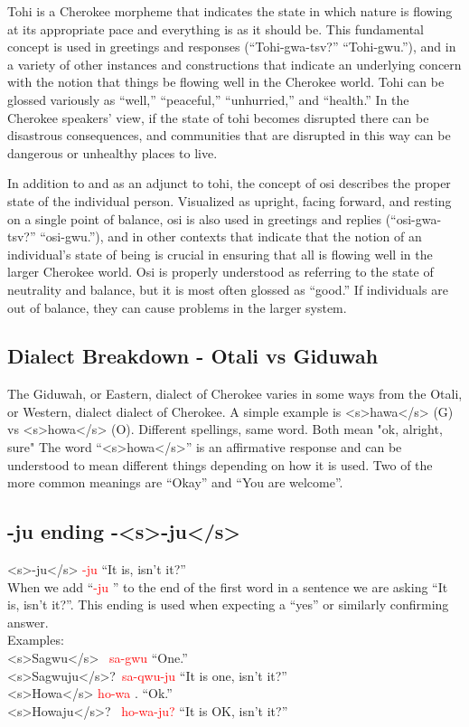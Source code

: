 Tohi is a Cherokee morpheme that indicates the state in which nature is flowing at its appropriate
pace and everything is as it should be. This fundamental concept
is used in greetings and responses (“Tohi-gwa-tsv?” “Tohi-gwu.”), and in
a variety of other instances and constructions that indicate an underlying
concern with the notion that things be flowing well in the Cherokee
world. Tohi can be glossed variously as “well,” “peaceful,” “unhurried,”
and “health.” In the Cherokee speakers’ view, if the state of tohi becomes
disrupted there can be disastrous consequences, and communities that
are disrupted in this way can be dangerous or unhealthy places to live.

In addition to and as an adjunct to tohi, the concept of osi describes
the proper state of the individual person. Visualized as upright, facing
forward, and resting on a single point of balance, osi is also used in
greetings and replies (“osi-gwa-tsv?” “osi-gwu.”), and in other contexts
that indicate that the notion of an individual’s state of being is crucial
in ensuring that all is flowing well in the larger Cherokee world. Osi is
properly understood as referring to the state of neutrality and balance,
but it is most often glossed as “good.” If individuals are out of balance,
they can cause problems in the larger system.
\cite{altmanBelt9192}

\subsection{Dialect Breakdown - Otali vs Giduwah}
The Giduwah, or Eastern, dialect of Cherokee varies in some ways from the Otali, or Western, dialect dialect of Cherokee.  A simple example is <s>hawa</s> (G) vs <s>howa</s> (O).  Different spellings, same word.  Both mean "ok, alright, sure" \cite{joynerlesson4} The word “<s>howa</s>” is an affirmative response and can be understood to mean different things depending on how it is used. Two of the more common meanings are “Okay” and “You are welcome”. \cite{joynerlesson4}

\subsection{-ju ending -<s>-ju</s>}
\noindent <s>-ju</s> \textcolor{red}{-ju} “It is, isn’t it?”\\
\indent When we add “\textcolor{red}{-ju} ” to the end of the first word in a sentence we are asking “It is, isn’t it?”. This ending is used when expecting a “yes” or similarly confirming answer.\\
\indent Examples:\\
\indent <s>Sagwu</s> \  \textcolor{red} {sa-gwu} “One.”\\
\indent \indent <s>Sagwuju</s>?\ \textcolor{red}{sa-qwu-ju} “It is one, isn’t it?”\\
\indent <s>Howa</s> \textcolor{red}{ho-wa} . “Ok.”\\
\indent \indent <s>Howaju</s>? \ \textcolor{red}{ho-wa-ju?}  “It is OK, isn’t it?”\\ \\

